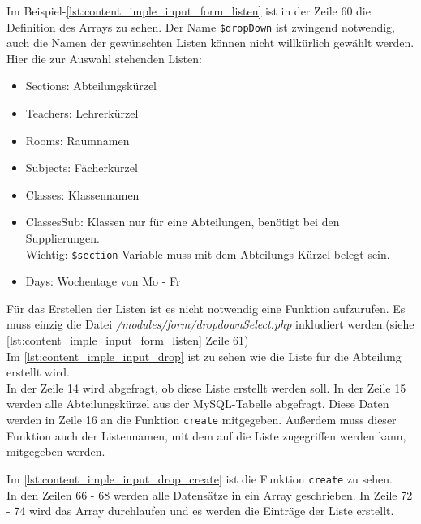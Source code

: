 

Im Beispiel-\autoref{lst:content_imple_input_form_listen} ist in der Zeile 60 die Definition des Arrays zu sehen. Der Name \texttt{\$dropDown} ist zwingend notwendig, auch die Namen der gewünschten Listen können nicht willkürlich gewählt werden. Hier die zur Auswahl stehenden Listen:
\begin{itemize}
	\item Sections: Abteilungskürzel
	\item Teachers: Lehrerkürzel
	\item Rooms: Raumnamen
	\item Subjects: Fächerkürzel
	\item Classes: Klassennamen
	\item ClassesSub: Klassen nur für eine Abteilungen, benötigt bei den Supplierungen. \\
	Wichtig: \texttt{\$section}-Variable muss mit dem Abteilungs-Kürzel belegt sein.
	\item Days: Wochentage von Mo - Fr
\end{itemize}
Für das Erstellen der Listen ist es nicht notwendig eine Funktion aufzurufen. Es muss einzig die Datei \textit{/modules/form/dropdownSelect.php} inkludiert werden.(siehe \autoref{lst:content_imple_input_form_listen} Zeile 61)\\
Im \autoref{lst:content_imple_input_drop} ist zu sehen wie die Liste für die Abteilung erstellt wird.\\
In der Zeile 14 wird abgefragt, ob diese Liste erstellt werden soll. In der Zeile 15 werden alle Abteilungskürzel aus der MySQL-Tabelle abgefragt. Diese Daten werden in Zeile 16 an die Funktion \texttt{create} mitgegeben. Außerdem muss dieser Funktion auch der Listennamen, mit dem auf die Liste zugegriffen werden kann, mitgegeben werden.

Im \autoref{lst:content_imple_input_drop_create} ist die Funktion \texttt{create} zu sehen.\\
In den Zeilen 66 - 68 werden alle Datensätze in ein Array geschrieben. In Zeile 72 - 74 wird das Array durchlaufen und es werden die Einträge der Liste erstellt.


